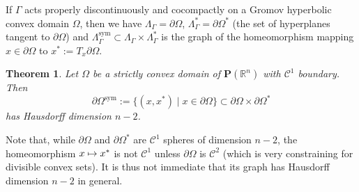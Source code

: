 \documentclass[10pt,a4paper]{amsart}
\newcommand{\sym}{\mathrm{sym}}
\newcommand\mto{\mathchoice{\longmapsto}{\mapsto}{\mapsto}{\mapsto}}
\newtheorem{theorem}[theo]{Theorem}
\theoremstyle{definition}
\newcommand{\proj}{\mathbf{P}}
\newcommand{\R}{\mathbb{R}}
\begin{document}
If $\Gamma$ acts properly discontinuously and cocompactly on a Gromov hyperbolic convex domain $\Omega$, then we have $\Lambda_\Gamma = \partial \Omega$, $\Lambda_\Gamma^* = \partial \Omega^*$ (the set of hyperplanes tangent to $\partial\Omega$) and $\Lambda^{\sym}_\Gamma \subset \Lambda_\Gamma \times \Lambda_\Gamma^*$ is the graph of the homeomorphism mapping $x\in \partial\Omega$ to $x^* := T_x \partial \Omega$.

\begin{theorem} \label{theo - HD Symmetric boundary convex}
Let $\Omega$ be a strictly convex domain of $\proj(\R^n)$ with $\mathcal C^1$ boundary. Then
\[\partial \Omega^{\sym} := \{(x,x^*)\mid x\in \partial \Omega\} \subset \partial \Omega \times \partial \Omega^*\]
has Hausdorff dimension $n-2$.
\end{theorem}

Note that, while $\partial \Omega$ and $\partial\Omega^*$ are $\mathcal C^1$ spheres of dimension $n-2$, the homeomorphism $x\mto x^*$ is not $\mathcal C^1$ unless $\partial \Omega$ is $\mathcal C^2$ (which is very constraining for divisible convex sets). It is thus not immediate that its graph has Hausdorff dimension $n-2$ in general.
\end{document}
